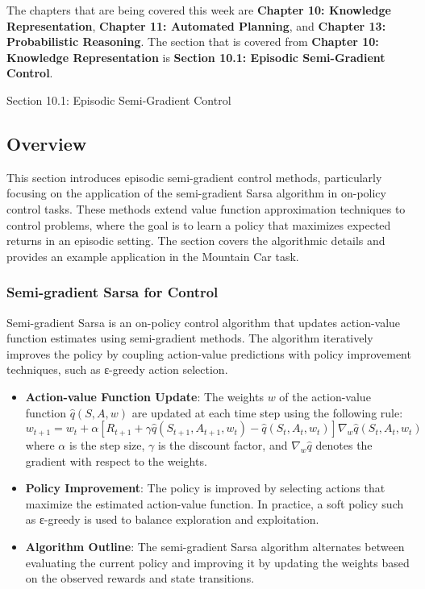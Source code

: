 The chapters that are being covered this week are \textbf{Chapter 10: Knowledge Representation}, \textbf{Chapter 11: Automated Planning}, and \textbf{Chapter 13: Probabilistic Reasoning}. The 
section that is covered from \textbf{Chapter 10: Knowledge Representation} is \textbf{Section 10.1: Episodic Semi-Gradient Control}.

\begin{notes}{Section 10.1: Episodic Semi-Gradient Control}
    \subsection*{Overview}

    This section introduces episodic semi-gradient control methods, particularly focusing on the application of the semi-gradient Sarsa algorithm in on-policy control tasks. These methods extend value 
    function approximation techniques to control problems, where the goal is to learn a policy that maximizes expected returns in an episodic setting. The section covers the algorithmic details and provides 
    an example application in the Mountain Car task.
    
    \subsubsection*{Semi-gradient Sarsa for Control}
    
    Semi-gradient Sarsa is an on-policy control algorithm that updates action-value function estimates using semi-gradient methods. The algorithm iteratively improves the policy by coupling action-value 
    predictions with policy improvement techniques, such as ε-greedy action selection.
    
    \begin{highlight}
    
        \begin{itemize}
            \item \textbf{Action-value Function Update}: The weights $w$ of the action-value function $\hat{q}(S, A, w)$ are updated at each time step using the following rule:
            \[
            w_{t+1} = w_t + \alpha \left[ R_{t+1} + \gamma \hat{q}(S_{t+1}, A_{t+1}, w_t) - \hat{q}(S_t, A_t, w_t) \right] \nabla_w \hat{q}(S_t, A_t, w_t)
            \]
            where $\alpha$ is the step size, $\gamma$ is the discount factor, and $\nabla_w \hat{q}$ denotes the gradient with respect to the weights.
            \item \textbf{Policy Improvement}: The policy is improved by selecting actions that maximize the estimated action-value function. In practice, a soft policy such as ε-greedy is used to balance exploration 
            and exploitation.
            \item \textbf{Algorithm Outline}: The semi-gradient Sarsa algorithm alternates between evaluating the current policy and improving it by updating the weights based on the observed rewards and 
            state transitions.
        \end{itemize}
    

\end{highlight}
\end{notes}
